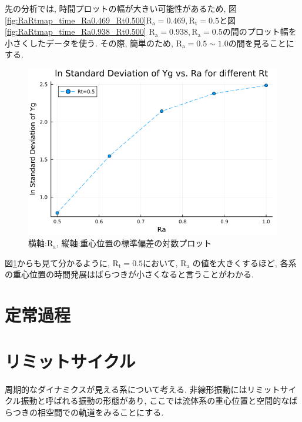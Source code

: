 \vspace{1\baselineskip}

先の分析では, 時間プロットの幅が大きい可能性があるため, 図\ref{fig:RaRtmap_time_Ra0.469_Rt0.500}$\text{R}_\text{a} = 0.469, \text{R}_\text{t} = 0.5$と図\ref{fig:RaRtmap_time_Ra0.938_Rt0.500} $\text{R}_\text{a} = 0.938, \text{R}_\text{a} = 0.5$の間のプロット幅を小さくしたデータを使う. その際, 簡単のため, $\text{R}_\text{a} =0.5 \sim 1.0$の間を見ることにする.



\begin{figure}[H]
  \centering
  \includegraphics[scale=0.5]{image/lnStdYg_Ra0.5to1.0_Rt0.5_ti25000.png}
  \caption{横軸:$\text{R}_\text{a}$, 縦軸:重心位置の標準偏差の対数プロット}
  \label{fig:lnStdYg_Ra0.5to1.0_Rt0.5_ti25000}
\end{figure}

図\ref{fig:lnStdYg_Ra0.5to1.0_Rt0.5_ti25000}からも見て分かるように, $\text{R}_\text{t} = 0.5$において, $\text{R}_\text{a}$ の値を大きくするほど, 各系の重心位置の時間発展はばらつきが小さくなると言うことがわかる.


\section{定常過程}


\section{リミットサイクル}

周期的なダイナミクスが見える系について考える. 非線形振動にはリミットサイクル振動\cite{Rhythm}と呼ばれる振動の形態があり, ここでは流体系の重心位置と空間的なばらつきの相空間での軌道をみることにする.

